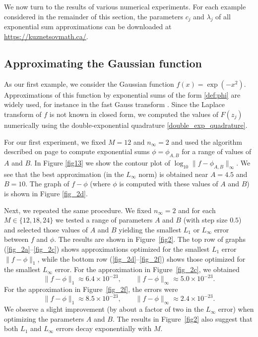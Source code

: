 \documentclass[12pt]{article}
\begin{document}
We now turn to the results of various numerical experiments. For each example considered in the remainder of this section, the parameters $c_j$ and $\lambda_j$ of all exponential sum approximations can be downloaded at \url{https://kuznetsovmath.ca/}.  




\subsection{Approximating the Gaussian function}\label{subsection_Gaussian}

As our first example, we consider the Gaussian function $f(x)=\exp(-x^2)$.  
Approximations of this function by exponential sums of the form \eqref{def:phi} are widely used, for instance in the fast Gauss transform \cite{Jiang2022,Kunis_2006}. Since the Laplace transform of $f$ is not known in closed form, we computed the values of $F(z_j)$ numerically using the double-exponential quadrature \eqref{double_exp_quadrature}.

For our first experiment, we fixed $M=12$ and $n_{\infty}=2$ and used the algorithm described on page \pageref{page_algorithm} to  compute exponential sums $\phi=\phi_{A,B}$ for a range of values of $A$ and $B$. In Figure \ref{fig13} we show the contour plot of $\log_{10} \| f -\phi_{A,B} \|_{\infty}$. We see that the best approximation (in the $L_{\infty}$ norm) is obtained near $A=4.5$ and $B=10$. The graph of $f-\phi$ (where $\phi$ is computed with these values of $A$ and $B$) is shown  in Figure \ref{fig_2d}. 

Next, we repeated the same procedure. We fixed $n_{\infty}=2$ and for each $M \in \{12,18,24\}$ we tested a range of parameters $A$ and $B$ (with step size $0.5$) and selected those values of $A$ and $B$ yielding the smallest $L_1$ or $L_{\infty}$ error between $f$ and $\phi$.  The results are shown in Figure~\ref{fig2}.  
The top row of graphs (\ref{fig_2a}–\ref{fig_2c}) shows approximations optimized for the smallest $L_1$ error $\|f-\phi\|_1$, while the bottom row (\ref{fig_2d}–\ref{fig_2f}) shows those optimized for the smallest $L_{\infty}$ error. For the approximation in Figure~\ref{fig_2c}, we obtained  
\[
\| f - \phi\|_1 \approx 6.4\times 10^{-23}, 
\qquad 
\| f - \phi\|_{\infty} \approx 5.0\times 10^{-23}.
\]
For the approximation in Figure~\ref{fig_2f}, the errors were  
\[
\| f - \phi\|_1 \approx 8.5\times 10^{-23}, 
\qquad 
\| f - \phi\|_{\infty} \approx 2.4\times 10^{-23}.
\]
We observe a slight improvement (by about a factor of two in the $L_{\infty}$ error) when optimizing the parameters $A$ and $B$. The results in Figure~\ref{fig2} also suggest that both $L_1$ and $L_{\infty}$ errors decay exponentially with $M$.  
\end{document}
